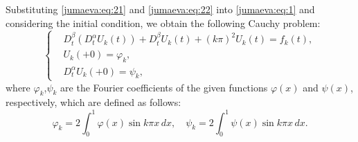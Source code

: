 \documentclass{amsart}
\numberwithin{equation}{section}
\begin{document}
Substituting \eqref{jumaeva:eq:21} and \eqref{jumaeva:eq:22} into \eqref{jumaeva:eq:1} and considering the initial condition, we obtain the following Cauchy problem:
\begin{equation*}
\left\{
\begin{aligned}
    &D_t^\beta(D_t^\alpha U_k(t)) + D_t^\beta U_k(t)+ (k\pi)^2 U_k(t) = f_k(t), \\
    &U_k(+0) = \varphi_k,\\
    &D_t^\alpha U_k(+0)=\psi_k,
\end{aligned}
\right.
\end{equation*}
where $\varphi_k$,$ \psi_k $ are the Fourier coefficients of the given functions $\varphi(x)$ and  $\psi(x)$, respectively, which are defined as follows:
\begin{equation*}
\varphi_k = 2 \int_0^1 \varphi(x) \sin k\pi x \, dx, \quad \psi_k = 2 \int_0^1 \psi(x) \sin k\pi x \, dx.
\end{equation*}
\end{document}
